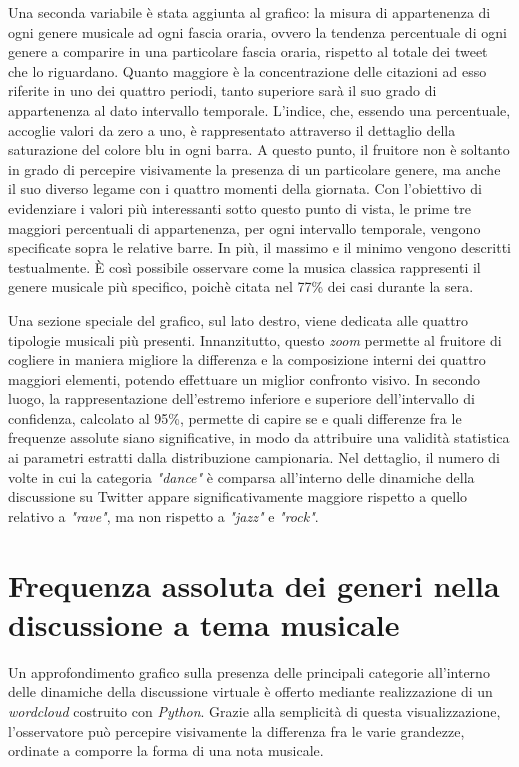 \documentclass[12pt, a4paper, twocolumn]{article} %
\begin{document}
Una seconda variabile è stata aggiunta al grafico: la misura di appartenenza di ogni genere musicale ad ogni fascia oraria, ovvero la tendenza percentuale di ogni genere a comparire in una particolare fascia oraria, rispetto al totale dei tweet che lo riguardano. 
Quanto maggiore è la concentrazione delle citazioni ad esso riferite in uno dei quattro periodi, tanto superiore sarà il suo grado di appartenenza al dato intervallo temporale. 
L'indice, che, essendo una percentuale, accoglie valori da zero a uno, è rappresentato attraverso il dettaglio della saturazione del colore blu in ogni barra.
A questo punto, il fruitore non è soltanto in grado di percepire visivamente la presenza di un particolare genere, ma anche il suo diverso legame con i quattro momenti della giornata. 
Con l'obiettivo di evidenziare i valori più interessanti sotto questo punto di vista, le prime tre maggiori percentuali di appartenenza, per ogni intervallo temporale, vengono specificate sopra le relative barre. 
In più, il massimo e il minimo vengono descritti testualmente. È così possibile osservare come la musica classica rappresenti il genere musicale più specifico, poichè citata nel 77\% dei casi durante la sera.

Una sezione speciale del grafico, sul lato destro, viene dedicata alle quattro tipologie musicali più presenti. 
Innanzitutto, questo \textit{zoom} permette al fruitore di cogliere in maniera migliore la differenza e la composizione interni dei quattro maggiori elementi, potendo effettuare un miglior confronto visivo. 
In secondo luogo, la rappresentazione dell'estremo inferiore e superiore dell'intervallo di confidenza, calcolato al 95\%, permette di capire se e quali differenze fra le frequenze assolute siano significative, in modo da attribuire una validità statistica ai parametri estratti dalla distribuzione campionaria. 
Nel dettaglio, il numero di volte in cui la categoria \textit{"dance"} è comparsa all'interno delle dinamiche della discussione su Twitter appare significativamente maggiore rispetto a quello relativo a \textit{"rave"}, ma non rispetto a \textit{"jazz"} e \textit{"rock"}. 

\section{Frequenza assoluta dei generi nella discussione a tema musicale}
Un approfondimento grafico sulla presenza delle principali categorie all'interno delle dinamiche della discussione virtuale è offerto mediante realizzazione di un \textit{wordcloud} costruito con \textit{Python}. 
Grazie alla semplicità di questa visualizzazione, l'osservatore può percepire visivamente la differenza fra le varie grandezze, ordinate a comporre la forma di una nota musicale.
\end{document}

